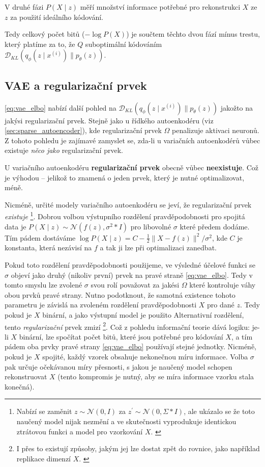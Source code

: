 V druhé fázi $P(X\mid z)$ měří množství informace potřebné pro rekonstrukci $X$ ze $z$ za použití ideálního kódování.

Tedy celkový počet bitů ($- \log P(X)$) je součtem těchto dvou fází mínus trestu, který platíme za to, že $Q$ suboptimální kódováním $\mathcal{D}_{KL}(q_\phi(z\mid x^{(i)})\parallel p_\theta(z))$. 


\subsection{VAE a regularizační prvek}
\autoref{eq:vae_elbo} nabízí další pohled na $\mathcal{D}_{KL}(q_\phi(z\mid x^{(i)})\parallel p_\theta(z))$ jakožto na jakýsi regularizační prvek.
Stejně jako u řídkého autoenkodéru (viz \autoref{sec:sparse_autoencoder}), kde regularizační prvek $\Omega$ penalizuje aktivaci neuronů.
Z tohoto pohledu je zajímavé zamyslet se, zda-li u variačních autoenkodérů vůbec existuje \emph{něco jako} regularizační prvek.

U variačního autoenkodéru \textbf{regularizační prvek} obecně vůbec \textbf{neexistuje}.
Což je výhodou – jelikož to znamená o jeden prvek, který je nutné optimalizovat, méně.

Nicméně, určité modely variačního autoenkodéru se jeví, že regularizační prvek \emph{existuje}
\footnote{Nabízí se zaměnit $z \sim \mathcal{N}(0, I)$ za $z^\prime \sim \mathcal{N}(0, \Sigma * I)$, ale ukázalo se že toto naučený model nijak nezmění a ve skutečnosti vyprodukuje identickou ztrátovou funkci a model pro vzorkování $X$. \cite{Doersch2021}}.
Dobrou volbou výstupního rozdělení pravděpodobnosti pro spojitá data je $P(X\mid z) \sim \mathcal{N}(f(z), \sigma^2 * I)$ pro libovolné $\sigma$ které předem dodáme.
Tím pádem dostáváme $\log P(X\mid z) = C - \frac{1}{2} \| X - f(z) \|^2 / \sigma^2$, kde $C$ je konstanta, která nezávisí na $f$ a tak ji lze při optimalizaci zanedbat.

Pokud toto rozdělení pravděpodobnosti použijeme, ve výsledné účelové funkci se $\sigma$ objeví jako druhý (nikoliv první) prvek na pravé straně \autoref{eq:vae_elbo}.
Tedy v tomto smyslu lze zvolené $\sigma$ svou rolí považovat za jakési $\Omega$ které kontroluje váhy obou prvků pravé strany.
Nutno podotknout, že samotná existence tohoto parametru je závislá na zvoleném rozdělení pravděpodobnosti $X$ pro dané $z$.
Tedy pokud je $X$ binární, a jako výstupní model je použito Alternativní rozdělení, tento \emph{regularizační} prvek zmizí 
\footnote{I přes to existují způsoby, jakým jej lze dostat zpět do rovnice, jako například replikace dimenzí $X$. \cite{Doersch2021}}.
Což z pohledu informační teorie dává logiku: je-li $X$ binární, lze spočítat počet bitů, které jsou potřebné pro kódování $X$, a tím pádem oba prvky pravé strany \autoref{eq:vae_elbo} používají stejné jednotky.
Nicméně, pokud je $X$ spojité, každý vzorek obsahuje nekonečnou míru informace. Volba $\sigma$ pak určuje očekávanou míry přesnosti, s jakou je naučený model schopen rekonstruovat $X$ (tento kompromis je nutný, aby se míra informace vzorku stala konečná).

